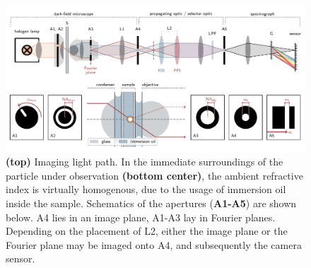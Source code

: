 \documentclass[10pt]{article}
\begin{document}
\begin{figure}[htbp]
    \centering
    \includegraphics[width=\textwidth]{[fig] setup}
    \caption{
    {\sffamily\bfseries (top)} Imaging light path. %
    In the immediate surroundings of the particle under observation {\sffamily\bfseries (bottom center)}, the ambient refractive index is virtually homogenous, due to the usage of immersion oil inside the sample.  
    Schematics of the apertures ({\sffamily\bfseries A1-A5}) are shown below. 
    {\sffamily A4} lies in an image plane, {\sffamily A1-A3} lay in Fourier planes. Depending on the placement of {\sffamily L2}, either the image plane or the Fourier plane may be imaged onto {\sffamily A4}, and subsequently the camera sensor. 
    }
    \label{fig:setup}
\end{figure}
\end{document}
